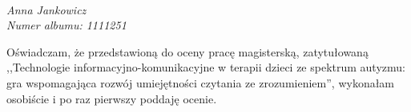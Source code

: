 \documentclass[a4paper,12pt]{report}
\newcommand{\authorname}{Anna Jankowicz}
\begin{document}
\newpage
\setcounter{page}{1}
\thispagestyle{firststyle}
\vspace*{10cm}
\emph{\\\authorname\\ Numer albumu: 1111251\\}

Oświadczam, że przedstawioną do oceny pracę magisterską, zatytułowaną
,,Technologie informacyjno-komunikacyjne w terapii dzieci ze spektrum autyzmu: gra wspomagająca rozwój umiejętności czytania ze zrozumieniem'', wykonałam osobiście i po raz pierwszy poddaję ocenie.




\tableofcontents
\thispagestyle{firststyle}







\renewcommand{\bibsetup}{\thispagestyle{firststyle}}
{\linespread{1.25}\printbibliography[heading=bibintoc]}
\end{document}
